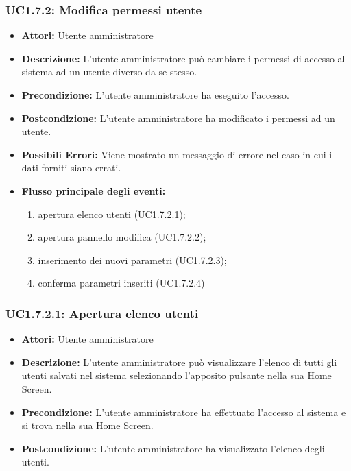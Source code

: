\subsubsection{UC1.7.2: Modifica permessi utente}

\begin{itemize}
    \item \textbf{Attori:} Utente amministratore
    \item \textbf{Descrizione:} L'utente amministratore può cambiare i permessi di accesso al sistema ad un utente diverso da se stesso.
    \item \textbf{Precondizione:} L'utente amministratore ha eseguito l'accesso.
    \item \textbf{Postcondizione:} L'utente amministratore ha modificato i permessi ad un utente.
    \item \textbf{Possibili Errori:}
    Viene mostrato un messaggio di errore nel caso in cui i dati forniti siano errati.
    \item \textbf{Flusso principale degli eventi:}

    \begin{enumerate}
        \item apertura elenco utenti (UC1.7.2.1);
        \item apertura pannello modifica (UC1.7.2.2);
        \item inserimento dei nuovi parametri (UC1.7.2.3);
        \item conferma parametri inseriti (UC1.7.2.4)
    \end{enumerate}

\end{itemize}

\subsubsection{UC1.7.2.1: Apertura elenco utenti}

\begin{itemize}
    \item \textbf{Attori:} Utente amministratore
    \item \textbf{Descrizione:} L'utente amministratore può visualizzare l'elenco di tutti gli utenti salvati nel sistema selezionando l'apposito pulsante nella sua Home Screen.
    \item \textbf{Precondizione:} L'utente amministratore ha effettuato l'accesso al sistema e si trova nella sua Home Screen.
    \item \textbf{Postcondizione:} L'utente amministratore ha visualizzato l'elenco degli utenti.
\end{itemize}

